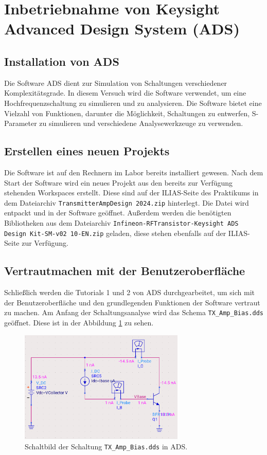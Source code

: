 \section{Inbetriebnahme von Keysight Advanced Design System (ADS)}
\subsection{Installation von ADS}
Die Software \ac{ADS} dient zur Simulation von Schaltungen verschiedener Komplexitätsgrade. 
In diesem Versuch wird die Software verwendet, um eine Hochfrequenzschaltung zu simulieren und zu analysieren. 
Die Software bietet eine Vielzahl von Funktionen, darunter die Möglichkeit, Schaltungen zu entwerfen, S-Parameter zu simulieren und verschiedene Analysewerkzeuge zu verwenden.

\subsection{Erstellen eines neuen Projekts}
Die Software ist auf den Rechnern im Labor bereits installiert gewesen. 
Nach dem Start der Software wird ein neues Projekt aus den bereits zur Verfügung stehenden Workspaces erstellt. 
Diese sind auf der ILIAS-Seite des Praktikums in dem Dateiarchiv \texttt{TransmitterAmpDesign 2024.zip} hinterlegt. 
Die Datei wird entpackt und in der Software geöffnet. Außerdem werden die benötigten Bibliotheken aus dem Dateiarchiv \texttt{Infineon-RFTransistor-Keysight ADS Design Kit-SM-v02 10-EN.zip} geladen, diese stehen ebenfalls auf der ILIAS-Seite zur Verfügung.
\subsection{Vertrautmachen mit der Benutzeroberfläche}
Schließlich werden die Tutorials 1 und 2 von \ac{ADS} durchgearbeitet, um sich mit der Benutzeroberfläche und den grundlegenden Funktionen der Software vertraut zu machen.
Am Anfang der Schaltungsanalyse wird das Schema \texttt{TX\_Amp\_Bias.dds} geöffnet. Diese ist in der Abbildung \ref{fig:TX_BIAS} zu sehen.

\begin{figure}[h]
    \centering
    \includegraphics[width=0.7\textwidth]{Pictures/TX_BIAS.png}
    \caption{Schaltbild der Schaltung \texttt{TX\_Amp\_Bias.dds} in \ac{ADS}.}
    \label{fig:TX_BIAS}
\end{figure}


